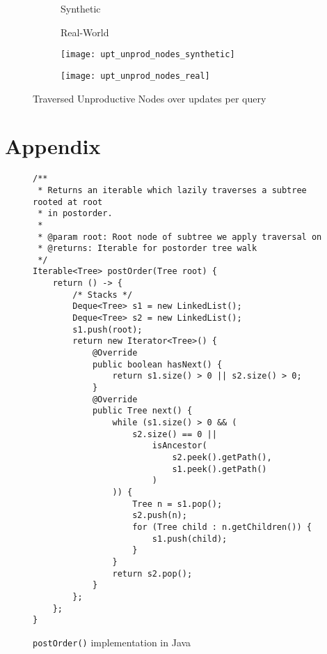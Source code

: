 \documentclass[abstracton,12pt]{scrartcl}
\theoremstyle{definition}
\begin{document}
\begin{figure}[h]
  \centering
  \begin{subfigure}{0.49\linewidth}
    \centering
    Synthetic
  \end{subfigure}
  \begin{subfigure}{0.49\linewidth}
    \centering
    Real-World
  \end{subfigure}
  \begin{subfigure}{0.49\linewidth}
    \centering
    \texttt{[image: upt\_unprod\_nodes\_synthetic]}
    \caption{}
    \label{fig:upt_unprod_nodes_synthetic}
  \end{subfigure}
  \begin{subfigure}{0.49\linewidth}
    \centering
    \texttt{[image: upt\_unprod\_nodes\_real]}
    \caption{}
    \label{fig:upt_unprod_nodes_real}
  \end{subfigure}
  \caption{Traversed Unproductive Nodes over updates per query}
\end{figure}

\lipsum[2-5]

\newpage




\newpage

\section{Appendix}

\begin{figure}[h]
  \centering
  \small
  \begin{framed}
\begin{verbatim}
/**
 * Returns an iterable which lazily traverses a subtree rooted at root
 * in postorder.
 *
 * @param root: Root node of subtree we apply traversal on
 * @returns: Iterable for postorder tree walk
 */
Iterable<Tree> postOrder(Tree root) {
    return () -> {
        /* Stacks */
        Deque<Tree> s1 = new LinkedList();
        Deque<Tree> s2 = new LinkedList();
        s1.push(root);
        return new Iterator<Tree>() {
            @Override
            public boolean hasNext() {
                return s1.size() > 0 || s2.size() > 0;
            }
            @Override
            public Tree next() {
                while (s1.size() > 0 && (
                    s2.size() == 0 ||
                        isAncestor(
                            s2.peek().getPath(),
                            s1.peek().getPath()
                        )
                )) {
                    Tree n = s1.pop();
                    s2.push(n);
                    for (Tree child : n.getChildren()) {
                        s1.push(child);
                    }
                }
                return s2.pop();
            }          
        };
    };
}
\end{verbatim}
  \end{framed}
  \caption{\texttt{postOrder()} implementation in Java}
  \label{fig:java_postorder}
\end{figure}
\end{document}
